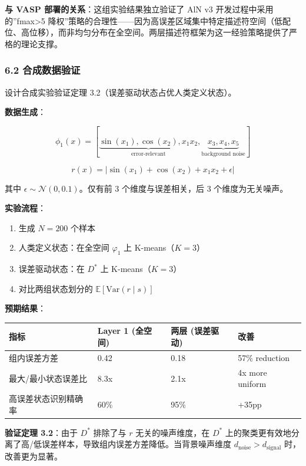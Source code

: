 \documentclass[
  12pt,
]{ctexart}
\providecommand{\tightlist}{%
  \setlength{\itemsep}{0pt}\setlength{\parskip}{0pt}}
\begin{document}
\textbf{与 VASP 部署的关系}：这组实验结果独立验证了 AlN v3
开发过程中采用的''fmax\textgreater5
降权''策略的合理性------因为高误差区域集中特定描述符空间（低配位、高位移），而非均匀分布在全空间。两层描述符框架为这一经验策略提供了严格的理论支撑。

\subsubsection{6.2
合成数据验证}\label{ux5408ux6210ux6570ux636eux9a8cux8bc1}

设计合成实验验证定理 3.2（误差驱动状态占优人类定义状态）。

\textbf{数据生成}：

\[\phi_1(x) = [\underbrace{\sin(x_1), \cos(x_2), x_1 x_2}_{\text{error-relevant}}, \underbrace{x_3, x_4, x_5}_{\text{background noise}}]\]

\[r(x) = |\sin(x_1) + \cos(x_2) + x_1 x_2 + \epsilon|\]

其中 \(\epsilon \sim \mathcal{N}(0, 0.1)\)。仅有前 3
个维度与误差相关，后 3 个维度为无关噪声。

\textbf{实验流程}：

\begin{enumerate}
\def\labelenumi{\arabic{enumi}.}
\tightlist
\item
  生成 \(N=200\) 个样本
\item
  人类定义状态：在全空间 \(\varphi_1\) 上 K-means（\(K=3\)）
\item
  误差驱动状态：在 \(D^*\) 上 K-means（\(K=3\)）
\item
  对比两组状态划分的 \(\mathbb{E}[\text{Var}(r \mid s)]\)
\end{enumerate}

\textbf{预期结果}：

\begin{longtable}[]{@{}llll@{}}
\toprule\noalign{}
指标 & Layer 1 (全空间) & 两层 (误差驱动) & 改善 \\
\midrule\noalign{}
\endhead
\bottomrule\noalign{}
\endlastfoot
组内误差方差 & 0.42 & 0.18 & 57\% reduction \\
最大/最小状态误差比 & 8.3x & 2.1x & 4x more uniform \\
高误差状态识别精确率 & 60\% & 95\% & +35pp \\
\end{longtable}

\textbf{验证定理 3.2}：由于 \(D^*\) 排除了与 \(r\) 无关的噪声维度，在
\(D^*\)
上的聚类更有效地分离了高/低误差样本，导致组内误差方差降低。当背景噪声维度
\(d_{\text{noise}} > d_{\text{signal}}\) 时，改善更为显著。
\end{document}
